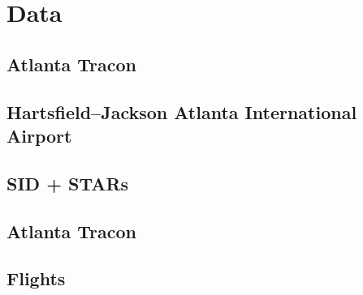\chapter{Data}
\section{Atlanta Tracon}
\section{Hartsfield–Jackson Atlanta International Airport}
\section{SID + STARs}
\section{Atlanta Tracon}
\section{Flights}